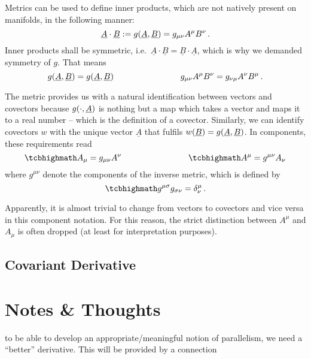 Metrics can be used to define inner products, which are not natively present on manifolds, in the following manner:
\begin{equation}
\underline{A} \cdot \underline{B} := g\qty(\underline{A}, \underline{B}) = g_{\mu \nu} A^\mu B^\nu \, .
\end{equation}
Inner products shall be symmetric, i.e.~$\underline{A} \cdot \underline{B} = \underline{B} \cdot \underline{A}$, which is why we demanded symmetry of $g$. That means
\begin{equation}
g\qty(\underline{A}, \underline{B}) = g\qty(\underline{A}, \underline{B})
\qquad \qquad \qquad \qquad
g_{\mu \nu} A^\mu B^\nu = g_{\nu \mu} A^\nu B^\mu \, .
\end{equation}

The metric provides us with a natural identification between vectors and covectors because $g\qty(\cdot, \underline{A})$ is nothing but a map which takes a vector and maps it to a real number -- which is the definition of a covector. Similarly, we can identify covectors $w$ with the unique vector $\underline{A}$ that fulfils $w\qty(\underline{B}) = g\qty(\underline{A}, \underline{B})$. In components, these requirements read
\begin{equation}
\eqbox{
A_\mu = g_{\mu \nu} A^\nu
}
\manyqquad
\eqbox{
A^\mu = g^{\mu \nu} A_\nu
}
\end{equation}
where $g^{\mu \nu}$ denote the components of the inverse metric, which is defined by
\begin{equation}
\eqbox{
g^{\mu \sigma} g_{\sigma \nu} = \delta^\mu_\nu
} \, .
\end{equation}

Apparently, it is almost trivial to change from vectors to covectors and vice versa in this component notation. For this reason, the strict distinction between $A^\mu$ and $A_\mu$ is often dropped (at least for interpretation purposes).



		\subsection{Covariant Derivative}



\newpage



	\section{Notes \& Thoughts}
to be able to develop an appropriate/meaningful notion of parallelism, we need a \enquote{better} derivative. This will be provided by a connection



